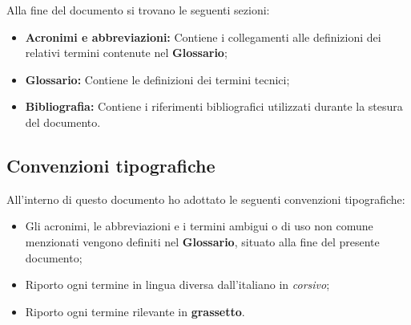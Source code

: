 Alla fine del documento si trovano le seguenti sezioni:
\begin{itemize}
    \item \textbf{Acronimi e abbreviazioni:} Contiene i collegamenti alle definizioni dei relativi termini contenute nel \textbf{Glossario};
    \item \textbf{Glossario:} Contiene le definizioni dei termini tecnici;
    \item \textbf{Bibliografia:} Contiene i riferimenti bibliografici utilizzati durante la stesura del documento.
\end{itemize}

\subsection*{Convenzioni tipografiche}
All'interno di questo documento ho adottato le seguenti convenzioni tipografiche:
\begin{itemize}
    \item Gli acronimi, le abbreviazioni e i termini ambigui o di uso non comune menzionati vengono definiti nel \textbf{Glossario}, situato alla fine del presente documento;
    \item Riporto ogni termine in lingua diversa dall'italiano in \textit{corsivo};
    \item Riporto ogni termine rilevante in \textbf{grassetto}.
\end{itemize}




\normalsize

\endgroup

\vfill
